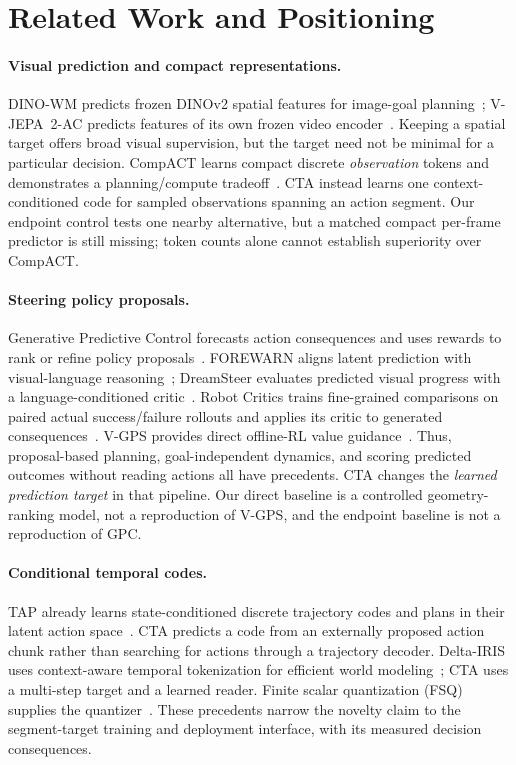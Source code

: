 \section{Related Work and Positioning}
\label{sec:related}
\paragraph{Visual prediction and compact representations.}
DINO-WM predicts frozen DINOv2 spatial features for image-goal planning~\cite{zhou2025dinowm,oquab2024dinov2}; V-JEPA~2-AC predicts features of its own frozen video encoder~\cite{assran2025vjepa2}. Keeping a spatial target offers broad visual supervision, but the target need not be minimal for a particular decision. CompACT learns compact discrete \emph{observation} tokens and demonstrates a planning/compute tradeoff~\cite{kim2026compact}. CTA instead learns one context-conditioned code for sampled observations spanning an action segment. Our endpoint control tests one nearby alternative, but a matched compact per-frame predictor is still missing; token counts alone cannot establish superiority over CompACT.

\paragraph{Steering policy proposals.}
Generative Predictive Control forecasts action consequences and uses rewards to rank or refine policy proposals~\cite{qi2025gpc}. FOREWARN aligns latent prediction with visual-language reasoning~\cite{wu2025forewarn}; DreamSteer evaluates predicted visual progress with a language-conditioned critic~\cite{cui2026dreamsteer}. Robot Critics trains fine-grained comparisons on paired actual success/failure rollouts and applies its critic to generated consequences~\cite{sudhakar2026critics}. V-GPS provides direct offline-RL value guidance~\cite{nakamoto2024vgps}. Thus, proposal-based planning, goal-independent dynamics, and scoring predicted outcomes without reading actions all have precedents. CTA changes the \emph{learned prediction target} in that pipeline. Our direct baseline is a controlled geometry-ranking model, not a reproduction of V-GPS, and the endpoint baseline is not a reproduction of GPC.

\paragraph{Conditional temporal codes.}
TAP already learns state-conditioned discrete trajectory codes and plans in their latent action space~\cite{jiang2023tap}. CTA predicts a code from an externally proposed action chunk rather than searching for actions through a trajectory decoder. Delta-IRIS uses context-aware temporal tokenization for efficient world modeling~\cite{micheli2024deltairis}; CTA uses a multi-step target and a learned reader. Finite scalar quantization (FSQ) supplies the quantizer~\cite{mentzer2024fsq}. These precedents narrow the novelty claim to the segment-target training and deployment interface, with its measured decision consequences.

